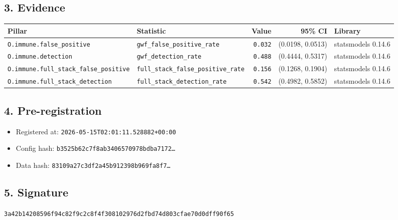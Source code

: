 \documentclass{article}
\begin{document}
\subsection*{3. Evidence}
\begin{tabular}{llrrl}\toprule
\textbf{Pillar} & \textbf{Statistic} & \textbf{Value} & \textbf{95\% CI} & \textbf{Library} \\\midrule
\texttt{O.immune.false\_positive} & \texttt{gwf\_false\_positive\_rate} & \texttt{0.032} & (0.0198, 0.0513) & statsmodels 0.14.6 \\
\texttt{O.immune.detection} & \texttt{gwf\_detection\_rate} & \texttt{0.488} & (0.4444, 0.5317) & statsmodels 0.14.6 \\
\texttt{O.immune.full\_stack\_false\_positive} & \texttt{full\_stack\_false\_positive\_rate} & \texttt{0.156} & (0.1268, 0.1904) & statsmodels 0.14.6 \\
\texttt{O.immune.full\_stack\_detection} & \texttt{full\_stack\_detection\_rate} & \texttt{0.542} & (0.4982, 0.5852) & statsmodels 0.14.6 \\
\bottomrule\end{tabular}
\subsection*{4. Pre-registration}
\begin{itemize}
\item Registered at: \texttt{2026-05-15T02:01:11.528882+00:00}
\item Config hash: \texttt{b3525b62c7f8ab3406570978bdba7172\dots}
\item Data hash: \texttt{83109a27c3df2a45b912398b969fa8f7\dots}
\end{itemize}
\subsection*{5. Signature}
\texttt{3a42b14208596f94c82f9c2c8f4f308102976d2fbd74d803cfae70d0dff90f65}\\
\end{document}
